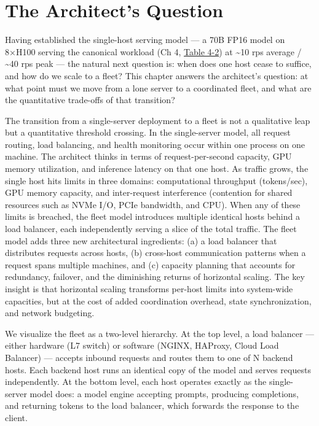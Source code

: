 \section*{The Architect's Question}\label{the-architects-question}

Having established the single-host serving model --- a 70B FP16 model on
8×H100 serving the canonical workload (Ch 4, \hyperref[tab:4.2]{Table 4-2}) at
\textasciitilde10 rps average / \textasciitilde40 rps peak --- the
natural next question is: when does one host cease to suffice, and how
do we scale to a fleet? This chapter answers the architect's question:
at what point must we move from a lone server to a coordinated fleet,
and what are the quantitative trade-offs of that transition?

\label{concept}


The transition from a single-server deployment to a fleet is not a
qualitative leap but a quantitative threshold crossing. In the
single-server model, all request routing, load balancing, and health
monitoring occur within one process on one machine. The architect thinks
in terms of request-per-second capacity, GPU memory utilization, and
inference latency on that one host. As traffic grows, the single host
hits limits in three domains: computational throughput (tokens/sec), GPU
memory capacity, and inter-request interference (contention for shared
resources such as NVMe I/O, PCIe bandwidth, and CPU). When any of these
limits is breached, the fleet model introduces multiple identical hosts
behind a load balancer, each independently serving a slice of the total
traffic. The fleet model adds three new architectural ingredients: (a) a
load balancer that distributes requests across hosts, (b) cross-host
communication patterns when a request spans multiple machines, and (c)
capacity planning that accounts for redundancy, failover, and the
diminishing returns of horizontal scaling. The key insight is that
horizontal scaling transforms per-host limits into system-wide
capacities, but at the cost of added coordination overhead, state
synchronization, and network budgeting.

\label{mental-model}


We visualize the fleet as a two-level hierarchy. At the top level, a
load balancer --- either hardware (L7 switch) or software (NGINX,
HAProxy, Cloud Load Balancer) --- accepts inbound requests and routes
them to one of N backend hosts. Each backend host runs an identical copy
of the model and serves requests independently. At the bottom level,
each host operates exactly as the single-server model does: a model
engine accepting prompts, producing completions, and returning tokens to
the load balancer, which forwards the response to the client.

